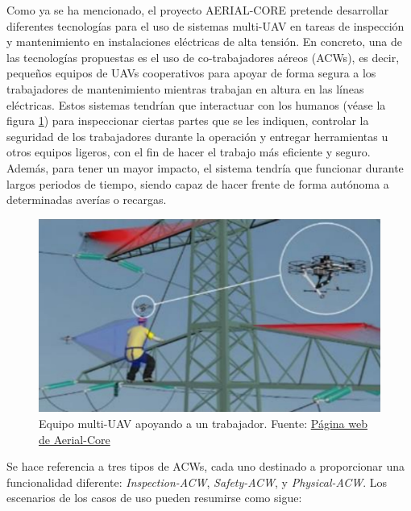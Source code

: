 \documentclass[fontsize=11pt, English=false, Español=true, Myfinal=true, twoside, numbers=noenddot]{scrbook}
\begin{document}
{Como ya se ha mencionado, el proyecto AERIAL-CORE pretende desarrollar diferentes tecnologías para el uso de sistemas multi-\gls{UAV} en tareas de inspección y mantenimiento en instalaciones eléctricas de alta tensión. En concreto, una de las tecnologías propuestas es el uso de co-trabajadores aéreos (\glspl{ACW}), es decir, pequeños equipos de \glspl{UAV} cooperativos para apoyar de forma segura a los trabajadores de mantenimiento mientras trabajan en altura en las líneas eléctricas. Estos sistemas tendrían que interactuar con los humanos (véase la figura \ref{fig:aerial_co_worker}) para inspeccionar ciertas partes que se les indiquen, controlar la seguridad de los trabajadores durante la operación y entregar herramientas u otros equipos ligeros, con el fin de hacer el trabajo más eficiente y seguro. Además, para tener un mayor impacto, el sistema tendría que funcionar durante largos periodos de tiempo, siendo capaz de hacer frente de forma autónoma a determinadas averías o recargas.

\begin{figure}[htbp]
    \centering
    \includegraphics[width=.75\linewidth]
    {ProblemFormulation/figures/aerial_co_worker.jpeg}
    \caption{Equipo multi-\gls{UAV} apoyando a un trabajador. Fuente: \href{https://aerial-core.eu/}{Página web de Aerial-Core}}
    \label{fig:aerial_co_worker}
\end{figure}

Se hace referencia a tres tipos de \glspl{ACW}, cada uno destinado a proporcionar una funcionalidad diferente: \textit{Inspection-ACW}, \textit{Safety-ACW}, y \textit{Physical-ACW}. Los escenarios de los casos de uso pueden resumirse como sigue: 

}
\end{document}
